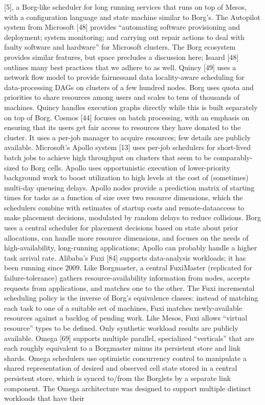 [5], a Borg-like scheduler for long running services that runs
on top of Mesos, with a configuration language and state
machine similar to Borg’s.
The Autopilot system from Microsoft [48] provides “automating software provisioning and deployment; system
monitoring; and carrying out repair actions to deal with
faulty software and hardware” for Microsoft clusters. The
Borg ecosystem provides similar features, but space precludes a discussion here; Isaard [48] outlines many best
practices that we adhere to as well.
Quincy [49] uses a network flow model to provide fairnessand data locality-aware scheduling for data-processing DAGs
on clusters of a few hundred nodes. Borg uses quota and priorities to share resources among users and scales to tens of
thousands of machines. Quincy handles execution graphs
directly while this is built separately on top of Borg.
Cosmos [44] focuses on batch processing, with an emphasis on ensuring that its users get fair access to resources
they have donated to the cluster. It uses a per-job manager to
acquire resources; few details are publicly available.
Microsoft’s Apollo system [13] uses per-job schedulers
for short-lived batch jobs to achieve high throughput on clusters that seem to be comparably-sized to Borg cells. Apollo
uses opportunistic execution of lower-priority background
work to boost utilization to high levels at the cost of (sometimes) multi-day queueing delays. Apollo nodes provide a
prediction matrix of starting times for tasks as a function
of size over two resource dimensions, which the schedulers
combine with estimates of startup costs and remote-dataaccess to make placement decisions, modulated by random
delays to reduce collisions. Borg uses a central scheduler for
placement decisions based on state about prior allocations,
can handle more resource dimensions, and focuses on the
needs of high-availability, long-running applications; Apollo
can probably handle a higher task arrival rate.
Alibaba’s Fuxi [84] supports data-analysis workloads;
it has been running since 2009. Like Borgmaster, a central FuxiMaster (replicated for failure-tolerance) gathers
resource-availability information from nodes, accepts requests from applications, and matches one to the other. The
Fuxi incremental scheduling policy is the inverse of Borg’s
equivalence classes: instead of matching each task to one
of a suitable set of machines, Fuxi matches newly-available
resources against a backlog of pending work. Like Mesos,
Fuxi allows “virtual resource” types to be defined. Only synthetic workload results are publicly available.
Omega [69] supports multiple parallel, specialized “verticals” that are each roughly equivalent to a Borgmaster minus
its persistent store and link shards. Omega schedulers use
optimistic concurrency control to manipulate a shared representation of desired and observed cell state stored in a central persistent store, which is synced to/from the Borglets by
a separate link component. The Omega architecture was designed to support multiple distinct workloads that have their


